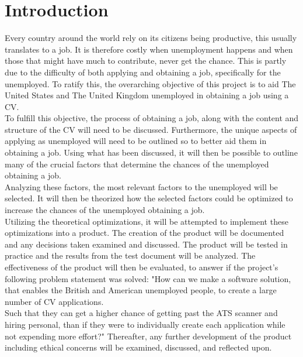 \section{Introduction}\label{sec:introduction}
Every country around the world rely on its citizens being productive, this usually translates to a job. 
It is therefore costly when unemployment happens and when those that might have much to contribute, never get the chance. 
This is partly due to the difficulty of both applying and obtaining a job, specifically for the unemployed. 
To ratify this, the overarching objective of this project is to aid The United States and The United Kingdom unemployed in obtaining a job using a CV. \\

To fulfill this objective, the process of obtaining a job, along with the content and structure of the CV will need to be discussed.
Furthermore, the unique aspects of applying as unemployed will need to be outlined so to better aid them in obtaining a job.
Using what has been discussed, it will then be possible to outline many of the crucial factors that determine the chances of the unemployed obtaining a job. \\

Analyzing these factors, the most relevant factors to the unemployed will be selected.
It will then be theorized how the selected factors could be optimized to increase the chances of the unemployed obtaining a job. \\

Utilizing the theoretical optimizations, it will be attempted to implement these optimizations into a product.
The creation of the product will be documented and any decisions taken examined and discussed. 
The product will be tested in practice and the results from the test document will be analyzed.
The effectiveness of the product will then be evaluated, to answer if the project's following problem statement was solved: "How can we make a software solution, that enables the British and American unemployed people, 
to create a large number of CV applications. \\

Such that they can get a higher chance of getting past the ATS scanner and hiring personal, than
if they were to individually create each application while not expending more effort?"
Thereafter, any further development of the product including ethical concerns will be examined, discussed, and reflected upon. \\

\newpage

